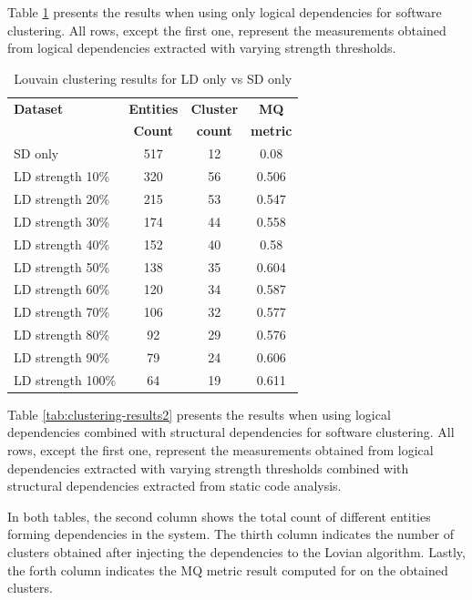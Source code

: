 \documentclass[conference, a4paper]{IEEEtran}
\begin{document}
Table \ref{tab:clustering-results1} presents the results when using only logical dependencies for software clustering. All rows, except the first one, represent the measurements obtained from logical dependencies extracted with varying strength thresholds.


\begin{table}[htbp]
  \centering
  \caption{Louvain clustering results for LD only vs SD only}
  \label{tab:clustering-results1}
  \begin{tabular}{lc|c|c}
    \toprule
    \textbf{Dataset} & \textbf{Entities} & \textbf{Cluster} & \textbf{MQ } \\
    & \textbf{Count} & \textbf{count} &  \textbf{metric} \\
    \midrule
    SD only & 517 & 12 & 0.08 \\
    \midrule
    LD strength 10\% & 320 & 56 & 0.506 \\
    LD strength 20\% & 215 & 53 & 0.547 \\
    LD strength 30\% & 174 & 44 & 0.558 \\
    LD strength 40\% & 152 & 40 & 0.58 \\
    LD strength 50\% & 138 & 35 & 0.604 \\
    LD strength 60\% & 120 & 34 & 0.587 \\
    LD strength 70\% & 106 & 32 & 0.577 \\
    LD strength 80\% & 92 & 29 & 0.576 \\
    LD strength 90\% & 79 & 24 & 0.606 \\
    LD strength 100\% & 64 & 19 & 0.611 \\
    \bottomrule
  \end{tabular}
\end{table}


Table \ref{tab:clustering-results2} presents the results when using logical dependencies combined with structural dependencies for software clustering. All rows, except the first one, represent the measurements obtained from logical dependencies extracted with varying strength thresholds combined with structural dependencies extracted from static code analysis.

In both tables, the second column shows the total count of different entities forming dependencies in the system. The thirth column indicates the number of clusters obtained after injecting the dependencies to the Lovian algorithm. Lastly, the forth column indicates the MQ metric result computed for on the obtained clusters.
\end{document}
